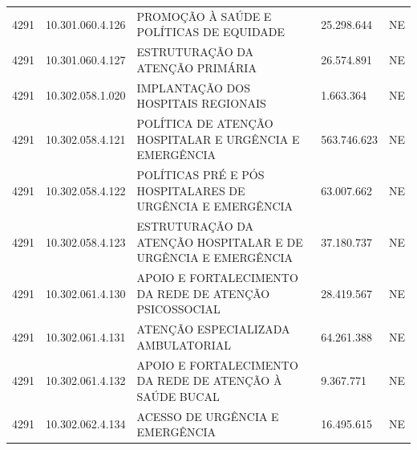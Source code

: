 \documentclass{article}
\begin{document}
\begin{longtable}[c]{m{1cm}|m{2cm}|m{10cm}|m{2cm}|m{1cm}}
\multicolumn{1}{C{1cm}|}{4291} & \multicolumn{1}{C{2cm}|}{10.301.060.4.126} & \multicolumn{1}{L{10cm}|}{PROMOÇÃO À SAÚDE E POLÍTICAS DE EQUIDADE} & \multicolumn{1}{R{2cm}|}{25.298.644} & \multicolumn{1}{C{1cm}}{NE} \\
\multicolumn{1}{C{1cm}|}{4291} & \multicolumn{1}{C{2cm}|}{10.301.060.4.127} & \multicolumn{1}{L{10cm}|}{ESTRUTURAÇÃO DA ATENÇÃO PRIMÁRIA} & \multicolumn{1}{R{2cm}|}{26.574.891} & \multicolumn{1}{C{1cm}}{NE} \\
\multicolumn{1}{C{1cm}|}{4291} & \multicolumn{1}{C{2cm}|}{10.302.058.1.020} & \multicolumn{1}{L{10cm}|}{IMPLANTAÇÃO DOS HOSPITAIS REGIONAIS} & \multicolumn{1}{R{2cm}|}{1.663.364} & \multicolumn{1}{C{1cm}}{NE} \\
\multicolumn{1}{C{1cm}|}{4291} & \multicolumn{1}{C{2cm}|}{10.302.058.4.121} & \multicolumn{1}{L{10cm}|}{POLÍTICA DE ATENÇÃO HOSPITALAR E URGÊNCIA E EMERGÊNCIA} & \multicolumn{1}{R{2cm}|}{563.746.623} & \multicolumn{1}{C{1cm}}{NE} \\
\multicolumn{1}{C{1cm}|}{4291} & \multicolumn{1}{C{2cm}|}{10.302.058.4.122} & \multicolumn{1}{L{10cm}|}{POLÍTICAS PRÉ E PÓS HOSPITALARES DE URGÊNCIA E EMERGÊNCIA} & \multicolumn{1}{R{2cm}|}{63.007.662} & \multicolumn{1}{C{1cm}}{NE} \\
\multicolumn{1}{C{1cm}|}{4291} & \multicolumn{1}{C{2cm}|}{10.302.058.4.123} & \multicolumn{1}{L{10cm}|}{ESTRUTURAÇÃO DA ATENÇÃO HOSPITALAR E DE URGÊNCIA E EMERGÊNCIA} & \multicolumn{1}{R{2cm}|}{37.180.737} & \multicolumn{1}{C{1cm}}{NE} \\
\multicolumn{1}{C{1cm}|}{4291} & \multicolumn{1}{C{2cm}|}{10.302.061.4.130} & \multicolumn{1}{L{10cm}|}{APOIO E FORTALECIMENTO DA REDE DE ATENÇÃO PSICOSSOCIAL} & \multicolumn{1}{R{2cm}|}{28.419.567} & \multicolumn{1}{C{1cm}}{NE} \\
\multicolumn{1}{C{1cm}|}{4291} & \multicolumn{1}{C{2cm}|}{10.302.061.4.131} & \multicolumn{1}{L{10cm}|}{ATENÇÃO ESPECIALIZADA AMBULATORIAL} & \multicolumn{1}{R{2cm}|}{64.261.388} & \multicolumn{1}{C{1cm}}{NE} \\
\multicolumn{1}{C{1cm}|}{4291} & \multicolumn{1}{C{2cm}|}{10.302.061.4.132} & \multicolumn{1}{L{10cm}|}{APOIO E FORTALECIMENTO DA REDE DE ATENÇÃO À SAÚDE BUCAL} & \multicolumn{1}{R{2cm}|}{9.367.771} & \multicolumn{1}{C{1cm}}{NE} \\
\multicolumn{1}{C{1cm}|}{4291} & \multicolumn{1}{C{2cm}|}{10.302.062.4.134} & \multicolumn{1}{L{10cm}|}{ACESSO DE URGÊNCIA E EMERGÊNCIA} & \multicolumn{1}{R{2cm}|}{16.495.615} & \multicolumn{1}{C{1cm}}{NE} \\

\end{longtable}
\end{document}

